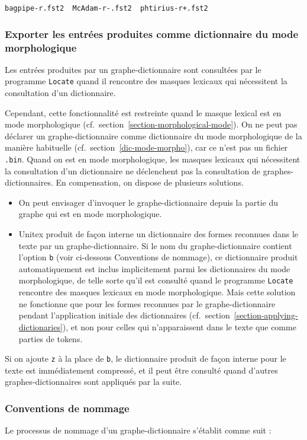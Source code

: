 \bigskip
\verb?bagpipe-r.fst2  McAdam-r-.fst2  phtirius-r+.fst2?


\subsubsection{Exporter les entrées produites comme dictionnaire du mode morphologique}
Les entrées produites par un graphe-dictionnaire sont consultées
par le programme \verb+Locate+ quand il rencontre des masques lexicaux qui nécessitent la consultation
d'un dictionnaire.

\bigskip
\noindent Cependant, cette fonctionnalité est restreinte quand le masque lexical est en mode morphologique
(cf.~section~\ref{section-morphological-mode}). On ne peut pas déclarer un graphe-dictionnaire
comme dictionnaire du mode morphologique de la manière habituelle (cf.~section~\ref{dic-mode-morpho}),
car ce n'est pas un fichier \verb+.bin+. Quand on est en mode morphologique, les masques
lexicaux qui nécessitent la consultation d'un dictionnaire ne déclenchent pas la consultation
de graphes-dictionnaires. En compensation, on dispose de plusieurs solutions.
\begin{itemize}
\item On peut envisager d'invoquer le graphe-dictionnaire depuis la partie du graphe qui est en mode morphologique.
\item Unitex produit de façon interne un dictionnaire des formes reconnues dans le texte par un
graphe-dictionnaire. Si le nom du graphe-dictionnaire contient l'option \verb+b+ (voir ci-dessous
Conventions de nommage), ce dictionnaire produit automatiquement est inclus implicitement parmi
les dictionnaires du mode morphologique, de telle sorte qu'il est consulté quand le programme
 \verb+Locate+ rencontre des masques lexicaux en mode morphologique. Mais cette solution 
 ne fonctionne que pour les formes reconnues par le graphe-dictionnaire pendant l'application initiale
 des dictionnaires (cf.~section~\ref{section-applying-dictionaries}), et non pour celles qui n'apparaissent
 dans le texte que comme parties de tokens.
\end{itemize}
Si on ajoute \verb+z+ à la place de  \verb+b+, le dictionnaire produit de façon interne pour le texte est immédiatement
compressé, et il peut être consulté quand d'autres graphes-dictionnaires sont appliqués  par la suite.
 
\subsubsection{Conventions de nommage}
Le processus de nommage d'un graphe-dictionnaire s'établit comme suit :\\

